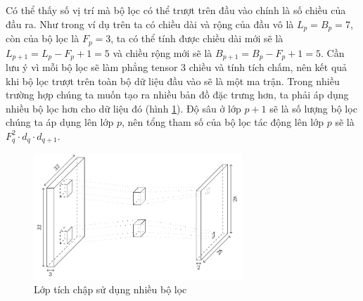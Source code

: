 Có thể thấy số vị trí mà bộ lọc có thể trượt trên đầu vào chính là số chiều của đầu ra. Như trong ví dụ trên ta có chiều dài và rộng của đầu vô là $L_p=B_p=7$, còn của bộ lọc là $F_p=3$, ta có thể tính được chiều dài mới sẽ là $L_{p+1}=L_p-F_p+1=5$ và chiều rộng mới sẽ là $B_{p+1}=B_p-F_p+1=5$. Cần lưu ý vì mỗi bộ lọc sẽ làm phẳng tensor 3 chiều và tính tích chấm, nên kết quả khi bộ lọc trượt trên toàn bộ dữ liệu đầu vào sẽ là một ma trận. Trong nhiều trường hợp chúng ta muốn tạo ra nhiều bản đồ đặc trưng hơn, ta phải áp dụng nhiều bộ lọc hơn cho dữ liệu đó (hình \ref{figure:convolution-layer-multi-filters}). Độ sâu ở lớp $p+1$ sẽ là số lượng bộ lọc chúng ta áp dụng lên lớp $p$, nên tổng tham số của bộ lọc tác động lên lớp $p$ sẽ là $F_q^2\cdot d_q\cdot d_{q+1}$.
\begin{figure}[htb]
    \centering
    \includegraphics[width=0.7\textwidth]{tikz_image/convolution_layer_multi_filters.pdf}
    \caption{Lớp tích chập sử dụng nhiều bộ lọc}
    \label{figure:convolution-layer-multi-filters}
\end{figure}

